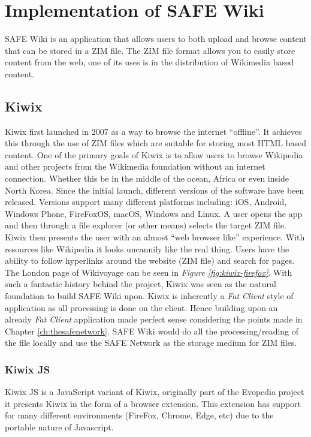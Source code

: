 \chapter{Implementation of SAFE Wiki}

SAFE Wiki is an application that allows users to both upload and browse content that can be stored in a ZIM file. The ZIM file format allows you to easily store content from the web, one of its uses is in the distribution of Wikimedia based content.

\section{Kiwix}

Kiwix first launched in 2007 as a way to browse the internet ``offline''. It achieves this through the use of ZIM files which are suitable for storing most HTML based content. One of the primary goals of Kiwix is to allow users to browse Wikipedia and other projects from the Wikimedia foundation without an internet connection. Whether this be in the middle of the ocean, Africa or even inside North Korea. Since the initial launch, different versions of the software have been released. Versions support many different platforms including: iOS, Android, Windows Phone, FireFoxOS, macOS, Windows and Linux. A user opens the app and then through a file explorer (or other means) selects the target ZIM file. Kiwix then presents the user with an almost ``web browser like'' experience. With resources like Wikipedia it looks uncannily like the real thing. Users have the ability to follow hyperlinks around the website (ZIM file) and search for pages. The London page of Wikivoyage can be seen in \textit{Figure \ref{fig:kiwix-firefox}}. With such a fantastic history behind the project, Kiwix was seen as the natural foundation to build SAFE Wiki upon. Kiwix is inherently a \textit{Fat Client} style of application as all processing is done on the client. Hence building upon an already \textit{Fat Client} application made perfect sense considering the points made in Chapter \ref{ch:thesafenetwork}. SAFE Wiki would do all the processing/reading of the file locally and use the SAFE Network as the storage medium for ZIM files.

\subsection{Kiwix JS}

Kiwix JS is a JavaScript variant of Kiwix, originally part of the Evopedia project it presents Kiwix in the form of a browser extension. This extension has support for many different environments (FireFox, Chrome, Edge, etc) due to the portable nature of Javascript.

